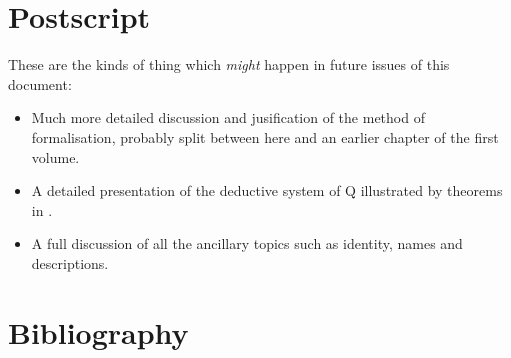 
\section{Postscript}\label{POSTSCRIPT}

These are the kinds of thing which {\it might} happen in future issues of this document:

\begin{itemize}
\item Much more detailed discussion and jusification of the method of formalisation, probably split between here and an earlier chapter of the first volume.
\item A detailed presentation of the deductive system of Q illustrated by theorems in {\Product}.
\item A full discussion of all the ancillary topics such as identity, names and descriptions.
\end{itemize}

\appendix

\vfill




\pagebreak

\section*{Bibliography}\label{BIBLIOGRAPHY}

{\def\section*#1{\ignore{#1}}
\raggedright


} %

{
{\small\printindex}}


